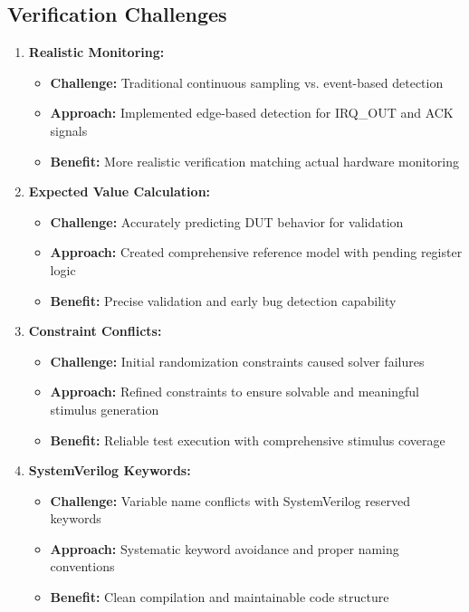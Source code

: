 \documentclass[12pt,a4paper]{article}
\begin{document}
\subsection{Verification Challenges}
\begin{enumerate}
    \item \textbf{Realistic Monitoring:} 
        \begin{itemize}
            \item \textbf{Challenge:} Traditional continuous sampling vs. event-based detection
            \item \textbf{Approach:} Implemented edge-based detection for IRQ\_OUT and ACK signals
            \item \textbf{Benefit:} More realistic verification matching actual hardware monitoring
        \end{itemize}
    
    \item \textbf{Expected Value Calculation:} 
        \begin{itemize}
            \item \textbf{Challenge:} Accurately predicting DUT behavior for validation
            \item \textbf{Approach:} Created comprehensive reference model with pending register logic
            \item \textbf{Benefit:} Precise validation and early bug detection capability
        \end{itemize}
    
    \item \textbf{Constraint Conflicts:} 
        \begin{itemize}
            \item \textbf{Challenge:} Initial randomization constraints caused solver failures
            \item \textbf{Approach:} Refined constraints to ensure solvable and meaningful stimulus generation
            \item \textbf{Benefit:} Reliable test execution with comprehensive stimulus coverage
        \end{itemize}
    
    \item \textbf{SystemVerilog Keywords:} 
        \begin{itemize}
            \item \textbf{Challenge:} Variable name conflicts with SystemVerilog reserved keywords
            \item \textbf{Approach:} Systematic keyword avoidance and proper naming conventions
            \item \textbf{Benefit:} Clean compilation and maintainable code structure
        \end{itemize}
\end{enumerate}
\end{document}
